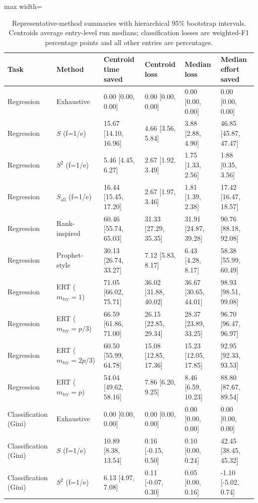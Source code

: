 \begin{table}[t]
\centering
\caption{Representative-method summaries with hierarchical 95\% bootstrap intervals. Centroids average entry-level run medians; classification losses are weighted-F1 percentage points and all other entries are percentages.}
\label{tab:summary_results}
\begin{adjustbox}{max width=\textwidth}
\scriptsize
\begin{tabular}{llllll}
\toprule
Task & Method & Centroid time saved & Centroid loss & Median loss & Median effort saved \\
\midrule
Regression & Exhaustive & 0.00 [0.00, 0.00] & 0.00 [0.00, 0.00] & 0.00 [0.00, 0.00] & 0.00 [0.00, 0.00] \\
Regression & $S$ (f=1/e) & 15.67 [14.10, 16.96] & 4.66 [3.56, 5.84] & 3.88 [2.88, 4.90] & 46.85 [45.87, 47.47] \\
Regression & $S^2$ (f=1/e) & 5.46 [4.45, 6.27] & 2.67 [1.92, 3.49] & 1.75 [1.33, 2.56] & 1.88 [0.35, 3.56] \\
Regression & $S_{\mathrm{all}}$ (f=1/e) & 16.44 [15.45, 17.20] & 2.67 [1.97, 3.46] & 1.81 [1.39, 2.38] & 17.42 [16.47, 18.57] \\
Regression & Rank-inspired & 60.46 [55.74, 65.03] & 31.33 [27.29, 35.35] & 31.91 [24.87, 39.28] & 90.76 [88.18, 92.08] \\
Regression & Prophet-style & 30.13 [26.74, 33.27] & 7.12 [5.83, 8.17] & 6.43 [4.28, 8.17] & 58.38 [55.99, 60.49] \\
Regression & ERT ($m_{\mathrm{try}}=1$) & 71.05 [66.02, 75.71] & 36.02 [31.88, 40.02] & 36.67 [30.65, 44.01] & 98.93 [98.51, 99.08] \\
Regression & ERT ($m_{\mathrm{try}}=p/3$) & 66.59 [61.86, 71.00] & 26.15 [22.85, 29.34] & 28.37 [23.89, 33.25] & 96.70 [96.47, 96.97] \\
Regression & ERT ($m_{\mathrm{try}}=2p/3$) & 60.50 [55.99, 64.78] & 15.08 [12.85, 17.36] & 15.23 [12.05, 17.85] & 92.95 [92.33, 93.53] \\
Regression & ERT ($m_{\mathrm{try}}=p$) & 54.04 [49.62, 58.16] & 7.86 [6.20, 9.25] & 8.46 [6.59, 10.23] & 88.80 [87.67, 89.54] \\
\midrule
Classification (Gini) & Exhaustive & 0.00 [0.00, 0.00] & 0.00 [0.00, 0.00] & 0.00 [0.00, 0.00] & 0.00 [0.00, 0.00] \\
Classification (Gini) & $S$ (f=1/e) & 10.89 [8.38, 13.54] & 0.16 [-0.15, 0.50] & 0.10 [0.00, 0.24] & 42.45 [38.45, 45.32] \\
Classification (Gini) & $S^2$ (f=1/e) & 6.13 [4.97, 7.08] & 0.11 [-0.07, 0.30] & 0.05 [0.00, 0.16] & -1.10 [-5.02, 0.74] \\

\end{tabular}
\end{adjustbox}
\end{table}
